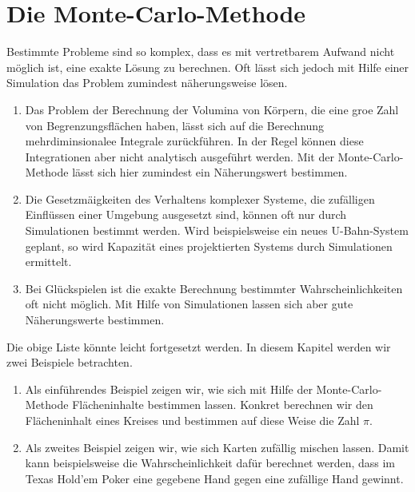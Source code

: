 \chapter{Die Monte-Carlo-Methode}
Bestimmte Probleme sind so komplex, dass es mit vertretbarem Aufwand nicht m\"oglich ist, eine exakte L\"osung zu
berechnen.  Oft l\"asst sich jedoch mit Hilfe einer Simulation das Problem zumindest n\"aherungsweise l\"osen.  
\begin{enumerate}
\item Das Problem der Berechnung der Volumina von K\"orpern, die eine gro\3e Zahl von Begrenzungsfl\"achen haben,
      l\"asst sich auf die Berechnung mehrdiminsionalee Integrale zur\"uckf\"uhren.  In der Regel k\"onnen diese
      Integrationen aber nicht analytisch ausgef\"uhrt werden.   Mit der Monte-Carlo-Methode l\"asst sich hier
      zumindest ein N\"aherungswert bestimmen.
\item Die Gesetzm\"a\3igkeiten des Verhaltens komplexer Systeme, die zuf\"alligen Einfl\"ussen einer Umgebung
      ausgesetzt sind, k\"onnen oft nur durch Simulationen bestimmt werden.  Wird beispielsweise ein neues
      U-Bahn-System geplant, so wird Kapazit\"at eines projektierten Systems durch Simulationen ermittelt.
\item Bei Gl\"uckspielen ist die exakte Berechnung bestimmter Wahrscheinlichkeiten oft nicht m\"oglich.
      Mit Hilfe von Simulationen lassen sich aber gute N\"aherungswerte bestimmen.  
\end{enumerate}
Die obige Liste k\"onnte leicht fortgesetzt werden.  In diesem Kapitel werden wir zwei Beispiele betrachten.
\begin{enumerate}
\item Als einf\"uhrendes Beispiel zeigen wir, wie sich mit Hilfe der Monte-Carlo-Methode Fl\"acheninhalte bestimmen
      lassen.  Konkret berechnen wir den Fl\"acheninhalt eines Kreises und bestimmen auf diese Weise
      die Zahl $\pi$.
\item Als zweites Beispiel zeigen wir, wie sich Karten zuf\"allig mischen lassen.
      Damit kann beispielsweise die Wahrscheinlichkeit daf\"ur berechnet werden, dass im Texas Hold'em Poker eine
      gegebene Hand gegen eine zuf\"allige Hand gewinnt.
\end{enumerate}

